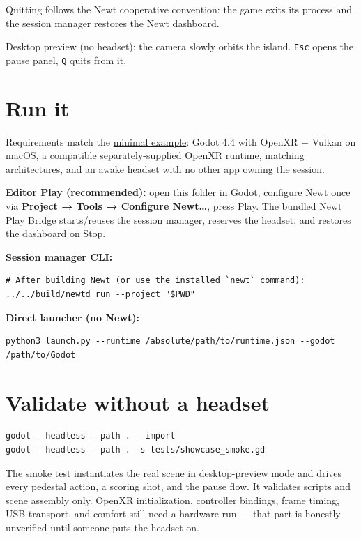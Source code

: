 \documentclass[11pt]{article}
\begin{document}
Quitting follows the Newt cooperative convention: the game exits its
process and the session manager restores the Newt dashboard.

Desktop preview (no headset): the camera slowly orbits the island.
\texttt{Esc} opens the pause panel, \texttt{Q} quits from it.
\section{Run it}
\label{sec:org311cbe9}
Requirements match the \href{../godot}{minimal example}: Godot 4.4 with OpenXR +
Vulkan on macOS, a compatible separately-supplied OpenXR runtime, matching
architectures, and an awake headset with no other app owning the session.

\textbf{Editor Play (recommended):} open this folder in Godot, configure Newt
once via \textbf{Project → Tools → Configure Newt…}, press Play. The bundled
Newt Play Bridge starts/reuses the session manager, reserves the headset,
and restores the dashboard on Stop.

\textbf{Session manager CLI:}
\begin{verbatim}
# After building Newt (or use the installed `newt` command):
../../build/newtd run --project "$PWD"
\end{verbatim}

\textbf{Direct launcher (no Newt):}
\begin{verbatim}
python3 launch.py --runtime /absolute/path/to/runtime.json --godot /path/to/Godot
\end{verbatim}
\section{Validate without a headset}
\label{sec:org6917062}
\begin{verbatim}
godot --headless --path . --import
godot --headless --path . -s tests/showcase_smoke.gd
\end{verbatim}
The smoke test instantiates the real scene in desktop-preview mode and
drives every pedestal action, a scoring shot, and the pause flow. It
validates scripts and scene assembly only. OpenXR initialization,
controller bindings, frame timing, USB transport, and comfort still need a
hardware run — that part is honestly unverified until someone puts the
headset on.
\end{document}
